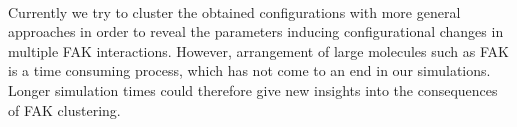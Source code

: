 \\
Currently we try to cluster the obtained configurations with more general approaches in order to reveal the parameters inducing configurational changes in multiple FAK interactions. However, arrangement of large molecules such as FAK is a time consuming process, which has not come to an end in our simulations. Longer simulation times could therefore give new insights into the consequences of FAK clustering. 